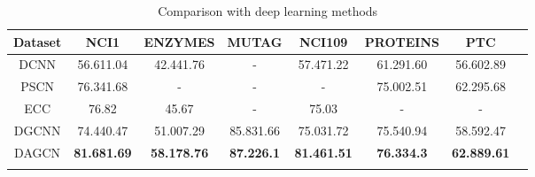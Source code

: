 \documentclass[conference]{IEEEtran}
\begin{document}
	\begin{table*}[t]
        \centering
        \caption{Comparison with deep learning methods}
        \begin{tabular}{cccccccc}
\hline
Dataset              & NCI1                             & ENZYMES                 & MUTAG                   & NCI109                  & PROTEINS                & PTC     \\
\hline
DCNN                 & 56.611.04                  & 42.441.76          & -                       & 57.471.22          & 61.291.60          & 56.602.89 \\
PSCN                 & 76.341.68                       & -                       & -                       & -                       & 75.002.51          & 62.295.68 \\
ECC                  & 76.82                                   & 45.67                   & -                       & 75.03                   & -                       & -              \\
DGCNN                & 74.440.47            & 51.007.29          & 85.831.66          & 75.031.72          & 75.540.94          & 58.592.47 \\
DAGCN               & \textbf{81.681.69}       & \textbf{58.178.76} & \textbf{87.226.1}  & \textbf{81.461.51} & \textbf{76.334.3}  & \textbf{62.889.61} \\ 
\hline
\multicolumn{1}{l}{} & \multicolumn{1}{l}{} & \multicolumn{1}{l}{} & \multicolumn{1}{l}{} & \multicolumn{1}{l}{} & \multicolumn{1}{l}{} & \multicolumn{1}{l}{} &               
        \end{tabular}
    \label{tb:result1}
    \end{table*}
\end{document}
